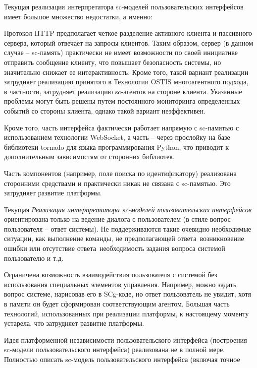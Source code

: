 Текущая реализация интерпретатора sc-моделей пользовательских интерфейсов имеет большое множество недостатки, а именно:
\begin{scnitemize}
    \item Протокол HTTP предполагает четкое разделение активного клиента и пассивного сервера, который отвечает
    на запросы клиентов. Таким образом, сервер (в данном случае -- sc-память) практически не имеет возможности по
    своей инициативе отправить сообщение клиенту, что повышает безопасность системы, но значительно снижает ее
    интерактивность. Кроме того, такой вариант реализации затрудняет реализацию принятого в Технологии OSTIS
    многоагентного подхода, в частности, затрудняет реализацию sc-агентов на стороне клиента. Указанные проблемы
    могут быть решены путем постоянного мониторинга определенных событий со стороны клиента, однако такой вариант
    неэффективен.
    \item Кроме того, часть интерфейса фактически работает напрямую с sc-памятью с использованием технологии
    WebSocket, а часть -- через прослойку на базе библиотеки tornado для языка программирования Python,
    что приводит к дополнительным зависимостям от сторонних библиотек.
    \item Часть компонентов (например, поле поиска по идентификатору) реализована сторонними средствами и практически
    никак не связана с sc-памятью. Это затрудняет развитие платформы.
    \item Текущая \textit{Реализация интерпретатора sc-моделей пользовательских интерфейсов} ориентирована только на
    ведение диалога с пользователем (в стиле вопрос пользователя -- ответ системы). Не поддерживаются такие очевидно
    необходимые ситуации, как выполнение команды, не предполагающей ответа~возникновение ошибки или отсутствие
    ответа~необходимость задания вопроса системой пользователю и т.д.
    \item Ограничена возможность взаимодействия пользователя с системой без использования специальных элементов
    управления. Например, можно задать вопрос системе, нарисовав его в SCg-коде, но ответ пользователь не увидит, хотя
    в памяти он будет сформирован соответствующим агентом. Большая часть технологий, использованных при реализации
    платформы, к настоящему моменту устарела, что затрудняет развитие платформы.
    \item Идея платформенной независимости пользовательского интерфейса (построения sc-модели пользовательского
    интерфейса) реализована не в полной мере. Полностью описать sc-модель пользовательского интерфейса (включая точное

\end{scnitemize}
